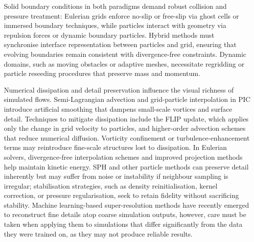 Solid boundary conditions in both paradigms demand robust collision and pressure treatment: Eulerian grids enforce no-slip or free-slip via ghost cells or immersed boundary techniques, while particles interact with geometry via repulsion forces or dynamic boundary particles. Hybrid methods must synchronise interface representation between particles and grid, ensuring that evolving boundaries remain consistent with divergence-free constraints. Dynamic domains, such as moving obstacles or adaptive meshes, necessitate regridding or particle reseeding procedures that preserve mass and momentum.


Numerical dissipation and detail preservation influence the visual richness of simulated flows. Semi-Lagrangian advection and grid-particle interpolation in PIC introduce artificial smoothing that dampens small-scale vortices and surface detail. Techniques to mitigate dissipation include the FLIP update, which applies only the change in grid velocity to particles, and higher-order advection schemes that reduce numerical diffusion. Vorticity confinement or turbulence-enhancement terms may reintroduce fine-scale structures lost to dissipation. In Eulerian solvers, divergence-free interpolation schemes and improved projection methods help maintain kinetic energy. SPH and other particle methods can preserve detail inherently but may suffer from noise or instability if neighbour sampling is irregular; stabilisation strategies, such as density reinitialisation, kernel correction, or pressure regularisation, seek to retain fidelity without sacrificing stability. Machine learning-based super-resolution methods have recently emerged to reconstruct fine details atop coarse simulation outputs, however, care must be taken when applying them to simulations that differ significantly from the data they were trained on, as they may not produce reliable results.



